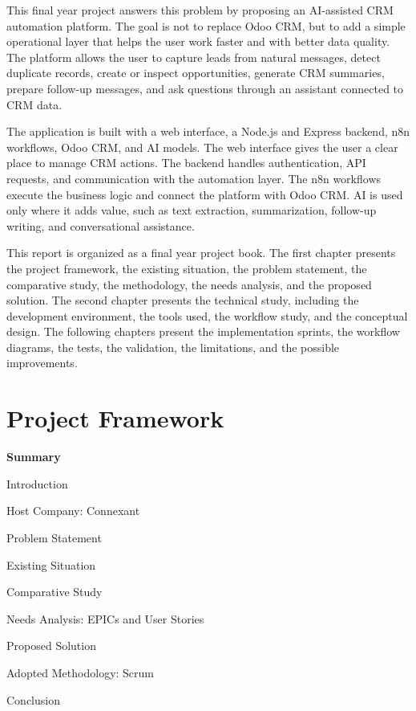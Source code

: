 \documentclass[12pt,a4paper,oneside]{report}
\newcommand{\chsummaryitem}[3]{\noindent\makebox[1.15cm][l]{#1}#2\,\dotfill\,\pageref{#3}\par}
\begin{document}
This final year project answers this problem by proposing an AI-assisted CRM automation platform. The goal is not to replace Odoo CRM, but to add a simple operational layer that helps the user work faster and with better data quality. The platform allows the user to capture leads from natural messages, detect duplicate records, create or inspect opportunities, generate CRM summaries, prepare follow-up messages, and ask questions through an assistant connected to CRM data.

The application is built with a web interface, a Node.js and Express backend, n8n workflows, Odoo CRM, and AI models. The web interface gives the user a clear place to manage CRM actions. The backend handles authentication, API requests, and communication with the automation layer. The n8n workflows execute the business logic and connect the platform with Odoo CRM. AI is used only where it adds value, such as text extraction, summarization, follow-up writing, and conversational assistance.

This report is organized as a final year project book. The first chapter presents the project framework, the existing situation, the problem statement, the comparative study, the methodology, the needs analysis, and the proposed solution. The second chapter presents the technical study, including the development environment, the tools used, the workflow study, and the conceptual design. The following chapters present the implementation sprints, the workflow diagrams, the tests, the validation, the limitations, and the possible improvements.

\chapter{Project Framework}

\vspace{0.35cm}
{\Large\bfseries Summary}\par
{}\vspace{0.30cm}
{\small
\chsummaryitem{1.1}{Introduction}{sumlbl:c1s1}
\chsummaryitem{1.2}{Host Company: Connexant}{sumlbl:c1company}
\chsummaryitem{1.3}{Problem Statement}{sumlbl:c1s2}
\chsummaryitem{1.4}{Existing Situation}{sumlbl:c1s3}
\chsummaryitem{1.5}{Comparative Study}{sumlbl:c1s4}
\chsummaryitem{1.6}{Needs Analysis: EPICs and User Stories}{sumlbl:c1s5}
\chsummaryitem{1.7}{Proposed Solution}{sumlbl:c1s6}
\chsummaryitem{1.8}{Adopted Methodology: Scrum}{sumlbl:c1s7}
\chsummaryitem{1.9}{Conclusion}{sumlbl:c1s8}
}
\clearpage
\end{document}
